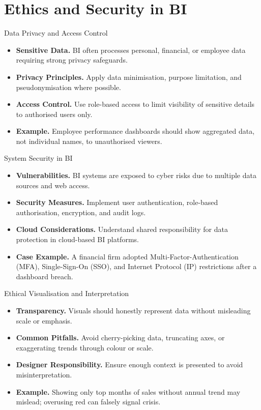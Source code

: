 \documentclass[aspectratio=169, table]{beamer}
\begin{document}
\section{Ethics and Security in BI}


\begin{frame}{Data Privacy and Access Control}
	\vspace{20pt}
	\begin{itemize}
		\item \textbf{Sensitive Data.} BI often processes personal, financial, or employee data requiring strong privacy safeguards.
		\item \textbf{Privacy Principles.} Apply data minimisation, purpose limitation, and pseudonymisation where possible.
		\item \textbf{Access Control.} Use role-based access to limit visibility of sensitive details to authorised users only.
		\item \textbf{Example.} Employee performance dashboards should show aggregated data, not individual names, to unauthorised viewers.
	\end{itemize}
\end{frame}



\begin{frame}{System Security in BI}
	\vspace{20pt}
	\begin{itemize}
		\item \textbf{Vulnerabilities.} BI systems are exposed to cyber risks due to multiple data sources and web access.
		\item \textbf{Security Measures.} Implement user authentication, role-based authorisation, encryption, and audit logs.
		\item \textbf{Cloud Considerations.} Understand shared responsibility for data protection in cloud-based BI platforms.
		\item \textbf{Case Example.} A financial firm adopted Multi-Factor-Authentication (MFA), Single-Sign-On (SSO), and Internet Protocol (IP) restrictions after a dashboard breach.
	\end{itemize}
\end{frame}


\begin{frame}{Ethical Visualisation and Interpretation}
	\vspace{20pt}
	\begin{itemize}
		\item \textbf{Transparency.} Visuals should honestly represent data without misleading scale or emphasis.
		\item \textbf{Common Pitfalls.} Avoid cherry-picking data, truncating axes, or exaggerating trends through colour or scale.
		\item \textbf{Designer Responsibility.} Ensure enough context is presented to avoid misinterpretation.
		\item \textbf{Example.} Showing only top months of sales without annual trend may mislead; overusing red can falsely signal crisis.
	\end{itemize}
\end{frame}
\end{document}
